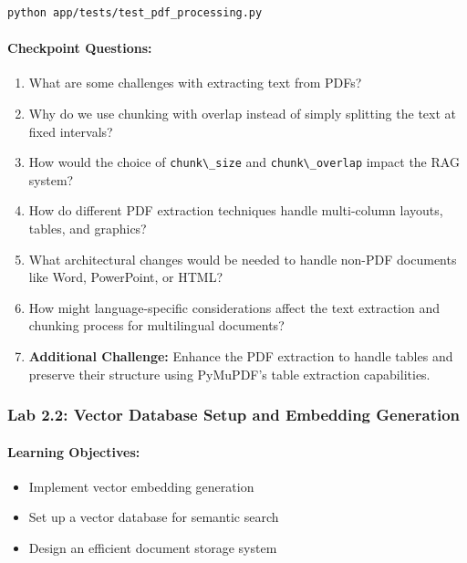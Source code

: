 \documentclass[
  screen,review,acmlarge]{acmart}
\newcommand{\passthrough}[1]{#1}
\providecommand{\tightlist}{%
  \setlength{\itemsep}{0pt}\setlength{\parskip}{0pt}}
\begin{document}
\begin{lstlisting}[language=bash]
python app/tests/test_pdf_processing.py
\end{lstlisting}

\paragraph{Checkpoint Questions:}\label{checkpoint-questions-2}

\begin{enumerate}
\def\labelenumi{\arabic{enumi}.}
\tightlist
\item
  What are some challenges with extracting text from PDFs?
\item
  Why do we use chunking with overlap instead of simply splitting the text at fixed intervals?
\item
  How would the choice of \passthrough{\lstinline!chunk\_size!} and \passthrough{\lstinline!chunk\_overlap!} impact the RAG system?
\item
  How do different PDF extraction techniques handle multi-column layouts, tables, and graphics?
\item
  What architectural changes would be needed to handle non-PDF documents like Word, PowerPoint, or HTML?
\item
  How might language-specific considerations affect the text extraction and chunking process for multilingual documents?
\item
  \textbf{Additional Challenge:} Enhance the PDF extraction to handle tables and preserve their structure using PyMuPDF's table extraction capabilities.
\end{enumerate}

\subsubsection{Lab 2.2: Vector Database Setup and Embedding Generation}\label{lab-2.2-vector-database-setup-and-embedding-generation}

\paragraph{Learning Objectives:}\label{learning-objectives-3}

\begin{itemize}
\tightlist
\item
  Implement vector embedding generation
\item
  Set up a vector database for semantic search
\item
  Design an efficient document storage system
\end{itemize}
\end{document}
